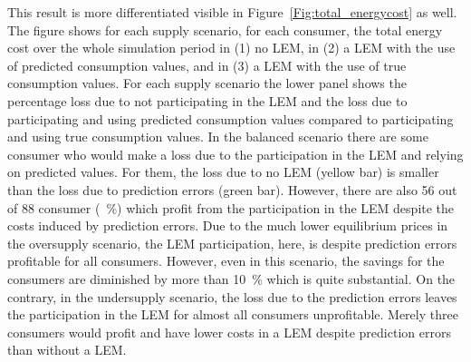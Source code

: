 This result is more differentiated visible in Figure~\ref{Fig:total_energycost} as well. The figure shows for each supply scenario, for each consumer, the total energy cost over the whole simulation period in (1) no LEM, in (2) a LEM with the use of predicted consumption values, and in (3) a LEM with the use of true consumption values. For each supply scenario the lower panel shows the percentage loss due to not participating in the LEM and the loss due to participating and using predicted consumption values compared to participating and using true consumption values. In the balanced scenario there are some consumer who would make a loss due to the participation in the LEM and relying on predicted values. For them, the loss due to no LEM (yellow bar) is smaller than the loss due to prediction errors (green bar). However, there are also 56 out of 88 consumer (~\%) which profit from the participation in the LEM despite the costs induced by prediction errors. Due to the much lower equilibrium prices in the oversupply scenario, the LEM participation, here, is despite prediction errors profitable for all consumers. However, even in this scenario, the savings for the consumers are diminished by more than 10~\% which is quite substantial. On the contrary, in the undersupply scenario, the loss due to the prediction errors leaves the participation in the LEM for almost all consumers unprofitable. Merely three consumers would profit and have lower costs in a LEM despite prediction errors than without a LEM.
%
